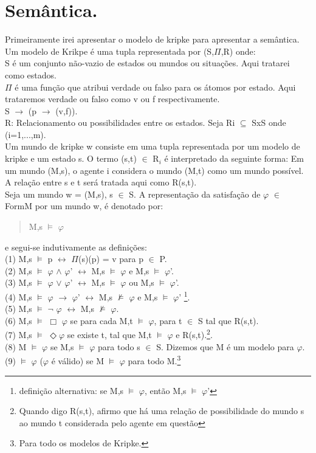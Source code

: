 \documentclass[12pt]{report}
\begin{document}
\section{Semântica.}
 \hspace{0.5cm}  Primeiramente irei apresentar o modelo de kripke para apresentar a semântica. Um modelo de Krikpe é uma tupla representada por (S,$\Pi$,R) onde:\\
\indent S é um conjunto não-vazio de estados ou mundos ou situações. Aqui tratarei como estados.\\
\indent $\Pi$ é uma função que atribui verdade ou falso para os átomos por estado. Aqui trataremos verdade ou falso como v ou f respectivamente.\\
\indent S $\rightarrow$ (p $\rightarrow$ (v,f)).\\
\indent R: Relacionamento ou possibilidades entre os estados. Seja Ri $\subseteq$ SxS onde (i=1,...,m).\\
           \indent Um mundo de kripke w consiste em uma tupla representada por um modelo de kripke e um estado s. O termo (s,t) $\in$ R$_{i}$ é interpretado da seguinte forma: Em um mundo (M,s), o agente i considera o mundo (M,t) como um mundo possível. A relação entre s e t será tratada aqui como R(s,t).\\
 \indent Seja um mundo w = (M,s), s $\in$ S. A representação da satisfação de $\varphi$ $\in$ FormM por um mundo w, é denotado por:\\
 \begin{quote}
 \indent M,s $\vDash$ $\varphi$\\
 \end{quote}
 e segui-se indutivamente as definições:\\
\indent (1) M,s $\vDash$ p $\leftrightarrow$ $\Pi$(s)(p) = v para p $\in$ P.\\
\indent (2) M,s $\vDash$ $\varphi$ $\land$ $\varphi$' $\leftrightarrow$ M,s $\vDash$ $\varphi$ e M,s $\vDash$ $\varphi$'.\\
\indent (3) M,s $\vDash$ $\varphi$ $\vee$ $\varphi$' $\leftrightarrow$ M,s $\vDash$ $\varphi$ ou M,s $\vDash$ $\varphi$'.\\
\indent (4) M,s $\vDash$ $\varphi$ $\rightarrow$ $\varphi$' $\leftrightarrow$ M,s $\nvDash$  $\varphi$ e M,s $\vDash$ $\varphi$' \footnote{definição alternativa: se M,s $\vDash$ $\varphi$, então M,s $\vDash$ $\varphi$'}. \\
\indent (5) M,s $\vDash$ $\neg$ $\varphi$ $\leftrightarrow$ M,s $\nvDash$ $\varphi$.\\
\indent (6) M,s $\vDash$ $\Box$ $\varphi$ se para cada M,t $\vDash$ $\varphi$, para t $\in$ S tal que 
R(s,t).\\
\indent (7) M,s $\vDash$ $\Diamond$$\varphi$ se existe t, tal que M,t $\vDash$ $\varphi$ e R(s,t).\footnote{Quando digo R(s,t), afirmo que há uma relação de possibilidade do mundo s ao mundo t considerada pelo agente em questão}.\\
\indent (8) M $\vDash$ $\varphi$ se M,s $\vDash$ $\varphi$ para todo s $\in$ S. Dizemos que M é um modelo para $\varphi$.\\
\indent (9) $\vDash$ $\varphi$ ($\varphi$ é válido) se M $\vDash$ $\varphi$ para todo M.\footnote{Para todo os modelos de Kripke.}\\
\end{document}
